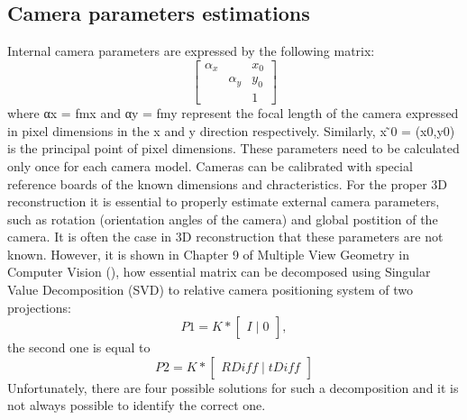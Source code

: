 \subsection{Camera parameters estimations}
Internal camera parameters are expressed by the following matrix:
\begin{equation}
\begin{bmatrix}
\alpha _{x} &  & x_{0} \\ 
 & \alpha _{y} & y_{0}\\ 
 &  & 1
\end{bmatrix}
\end{equation}
where αx = fmx and αy = fmy represent the focal length of the camera expressed in pixel dimensions in the x and y direction respectively. 
Similarly, x ̃0 = (x0,y0) is the principal point of pixel dimensions. These parameters need to be calculated only once for each camera model. Cameras can be calibrated with special reference boards of the known dimensions and chracteristics.
For the proper 3D reconstruction it is essential to properly estimate external camera parameters, such as rotation (orientation angles of the camera) and global postition of the camera. It is often the case in 3D reconstruction that these parameters are not known. However, it is shown in Chapter 9 of Multiple View Geometry in Computer Vision (\cite{HartleyMultipleView}), how essential matrix can be decomposed using Singular Value Decomposition (SVD) to relative camera positioning system of two projections:
\begin{equation}
 P1 = K * \begin{bmatrix}I\mid 0\end{bmatrix},
\end{equation}
the second one is equal to 
\begin{equation}
 P2 = K * \begin{bmatrix}RDiff\mid tDiff\end{bmatrix}
\end{equation}
Unfortunately, there are four possible solutions for such a decomposition and it is not always possible to identify the correct one.
